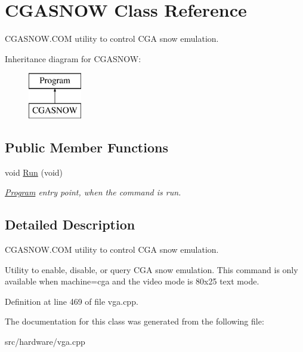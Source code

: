 \hypertarget{classCGASNOW}{\section{C\-G\-A\-S\-N\-O\-W Class Reference}
\label{classCGASNOW}
}


C\-G\-A\-S\-N\-O\-W.\-C\-O\-M utility to control C\-G\-A snow emulation.  


Inheritance diagram for C\-G\-A\-S\-N\-O\-W\-:\begin{figure}[H]
\begin{center}
\leavevmode
\includegraphics[height=2.000000cm]{classCGASNOW}
\end{center}
\end{figure}
\subsection*{Public Member Functions}
\begin{DoxyCompactItemize}
\item 
\hypertarget{classCGASNOW_a756619df2231c00d48df4bfec4a8965b}{void \hyperlink{classCGASNOW_a756619df2231c00d48df4bfec4a8965b}{Run} (void)}\label{classCGASNOW_a756619df2231c00d48df4bfec4a8965b}

\begin{DoxyCompactList}\small\item\em \hyperlink{classProgram}{Program} entry point, when the command is run. \end{DoxyCompactList}\end{DoxyCompactItemize}


\subsection{Detailed Description}
C\-G\-A\-S\-N\-O\-W.\-C\-O\-M utility to control C\-G\-A snow emulation. 

Utility to enable, disable, or query C\-G\-A snow emulation. This command is only available when machine=cga and the video mode is 80x25 text mode. 

Definition at line 469 of file vga.\-cpp.



The documentation for this class was generated from the following file\-:\begin{DoxyCompactItemize}
\item 
src/hardware/vga.\-cpp\end{DoxyCompactItemize}
